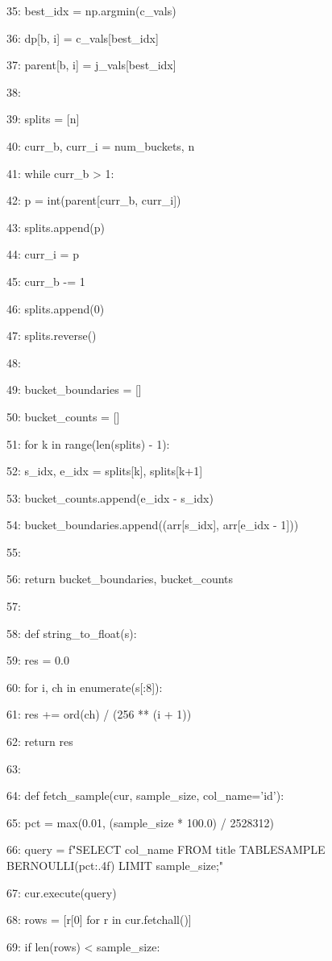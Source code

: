 \documentclass[11pt,a4paper]{article}
\begin{document}
35:             best\_idx = np.argmin(c\_vals)

36:             dp[b, i] = c\_vals[best\_idx]

37:             parent[b, i] = j\_vals[best\_idx]

38:

39:     splits = [n]

40:     curr\_b, curr\_i = num\_buckets, n

41:     while curr\_b > 1:

42:         p = int(parent[curr\_b, curr\_i])

43:         splits.append(p)

44:         curr\_i = p

45:         curr\_b -= 1

46:     splits.append(0)

47:     splits.reverse()

48:

49:     bucket\_boundaries = []

50:     bucket\_counts = []

51:     for k in range(len(splits) - 1):

52:         s\_idx, e\_idx = splits[k], splits[k+1]

53:         bucket\_counts.append(e\_idx - s\_idx)

54:         bucket\_boundaries.append((arr[s\_idx], arr[e\_idx - 1]))

55:

56:     return bucket\_boundaries, bucket\_counts

57:

58: def string\_to\_float(s):

59:     res = 0.0

60:     for i, ch in enumerate(s[:8]):

61:         res += ord(ch) / (256 ** (i + 1))

62:     return res

63:

64: def fetch\_sample(cur, sample\_size, col\_name='id'):

65:     pct = max(0.01, (sample\_size * 100.0) / 2528312)

66:     query = f"SELECT {col\_name} FROM title TABLESAMPLE BERNOULLI({pct:.4f}) LIMIT {sample\_size};"

67:     cur.execute(query)

68:     rows = [r[0] for r in cur.fetchall()]

69:     if len(rows) < sample\_size:
\end{document}
